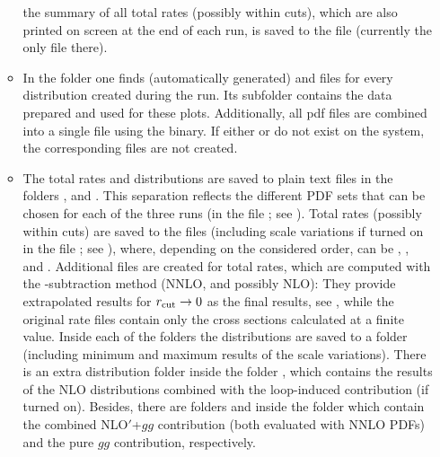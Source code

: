 \documentclass[english,11pt]{article}
\begin{document}
\begin{itemize}
\begin{itemize}[leftmargin=*]
the summary of all total rates (possibly within cuts), which are also printed on screen at the end of each run, is 
saved to the file  (currently the only file there).%
\item In the folder  one finds (automatically generated)  and  files for every distribution created during the run. Its  subfolder contains the data prepared and used for these plots. Additionally, all pdf files are combined into a single file  using the 
 binary. If either  or  do not exist on the system, 
the corresponding  files are not created.
\item The total rates and distributions are saved to plain text files in the folders ,  and . This separation reflects the different PDF sets that can be chosen for each of the three runs (in the file ; see ). Total rates (possibly within cuts) are saved to the files  (including scale variations if turned on in the file ; see ), where, depending on the considered order,  can be , ,  and . Additional files  are created for total rates, which are computed with the \qt{}-subtraction method (NNLO, and possibly NLO): They provide extrapolated results for $r_{\mathrm{cut}}{}\rightarrow 0$ as the final results, see , while the original rate files contain only the cross sections calculated at a finite \rcut{} value. Inside each of the  folders the distributions are saved to a folder  (including minimum and maximum results of the scale variations). There is an extra distribution folder 
inside the folder , which contains the results of the NLO 
distributions combined with the loop-induced contribution (if turned on). Besides, there are 
folders  and  inside the folder 
which contain the combined NLO$'$+$gg$ contribution (both evaluated with NNLO PDFs) and the pure $gg$ contribution, respectively.%

\end{itemize}
\end{itemize}
\end{document}
